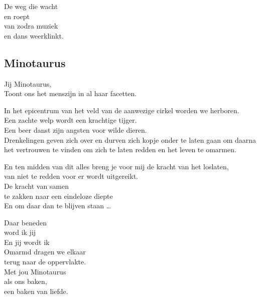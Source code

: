 \documentclass[
  11pt,
]{book}
\begin{document}
De weg die wacht\\
en roept\\
van zodra muziek\\
en dans weerklinkt.

\hypertarget{minotaurus}{%
\subsection*{Minotaurus}\label{minotaurus}}

Jij Minotaurus,\\
Toont ons het menszijn in al haar facetten.

In het epicentrum van het veld van de aanwezige cirkel worden we herboren.\\
Een zachte welp wordt een krachtige tijger.\\
Een beer danst zijn angsten voor wilde dieren.\\
Drenkelingen geven zich over en durven zich kopje onder te laten gaan om daarna het vertrouwen te vinden om zich te laten redden en het leven te omarmen.

En ten midden van dit alles breng je voor mij de kracht van het loslaten,\\
van niet te redden voor er wordt uitgereikt.\\
De kracht van samen\\
te zakken naar een eindeloze diepte\\
En om daar dan te blijven staan \ldots{}

Daar beneden\\
word ik jij\\
En jij wordt ik\\
Omarmd dragen we elkaar\\
terug naar de oppervlakte.\\
Met jou Minotaurus\\
als ons baken,\\
een baken van liefde.

  
\end{document}

